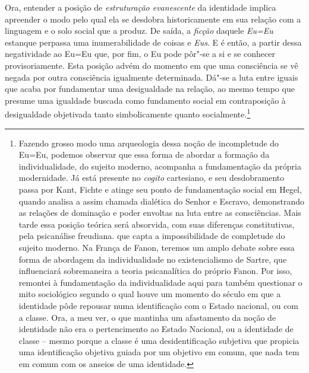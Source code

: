 Ora, entender a posição de \emph{estruturação evanescente} da identidade
implica apreender o modo pelo qual ela se desdobra historicamente em sua
relação com a linguagem e o solo social que a produz. De saída, a
\emph{ficção} daquele \emph{Eu=Eu} estanque perpassa uma inumerabilidade
de coisas e \emph{Eus}. E é então, a partir dessa negatividade ao Eu=Eu
que, por fim, o Eu pode pôr"-se a si e se conhecer provisoriamente. Esta
posição advém do momento em que uma consciência se vê negada por outra
consciência igualmente determinada. Dá"-se a luta entre iguais que acaba
por fundamentar uma desigualdade na relação, ao mesmo tempo que presume
uma igualdade buscada como fundamento social em contraposição à
desigualdade objetivada tanto simbolicamente quanto
socialmente.\footnote{Fazendo grosso modo uma arqueologia dessa noção de
  incompletude do Eu=Eu, podemos observar que essa forma de abordar a
  formação da individualidade, do sujeito moderno, acompanha a
  fundamentação da própria modernidade. Já está presente no
  \emph{cogito} cartesiano, e seu desdobramento passa por Kant, Fichte e atinge seu ponto de fundamentação social em Hegel, quando analisa a
  assim chamada dialética do Senhor e Escravo, demonstrando as relações
  de dominação e poder envoltas na luta entre as consciências. Mais
  tarde essa posição teórica será absorvida, com suas diferenças
  constitutivas, pela psicanálise freudiana. que capta a impossibilidade
  de completude do sujeito moderno. Na França de Fanon, teremos um amplo
  debate sobre essa forma de abordagem da individualidade no
  existencialismo de Sartre, que influenciará sobremaneira a teoria
  psicanalítica do próprio Fanon. Por isso, remontei à fundamentação da
  individualidade aqui para também questionar o mito sociológico segundo
  o qual houve um momento do século  em que a identidade pôde repousar
  numa identificação com o Estado nacional, ou com a classe. Ora, a meu
  ver, o que mantinha um afastamento da noção de identidade não era o
  pertencimento ao Estado Nacional, ou a identidade de classe -- mesmo
  porque a classe é uma desidentificação subjetiva que propicia uma
  identificação objetiva guiada por um objetivo em comum, que nada tem
  em comum com os anseios de uma identidade.}

